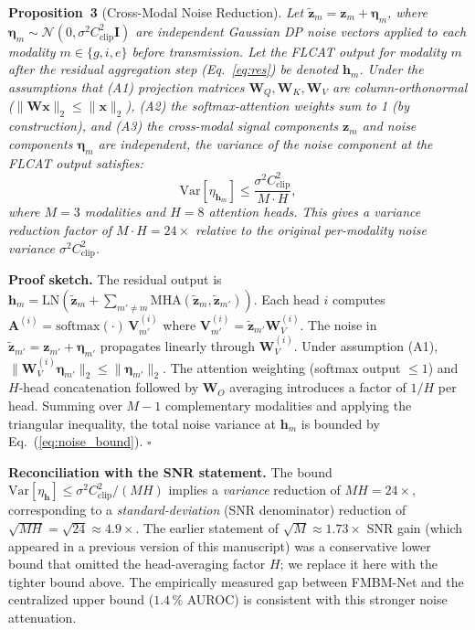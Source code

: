 \documentclass[a4paper,fleqn]{cas-dc}
\begin{document}
\textbf{Proposition~3} (Cross-Modal Noise Reduction).
\textit{Let $\tilde{\mathbf{z}}_m = \mathbf{z}_m + \boldsymbol{\eta}_m$,
where $\boldsymbol{\eta}_m \!\sim\!\mathcal{N}(0,\sigma^2 C_{\mathrm{clip}}^2
\mathbf{I})$ are independent Gaussian DP noise vectors applied to each modality
$m \in \{g,i,e\}$ before transmission. Let the FLCAT output for modality $m$
after the residual aggregation step (Eq.~\ref{eq:res}) be denoted
$\mathbf{h}_m$. Under the assumptions that (A1) projection matrices
$\mathbf{W}_Q, \mathbf{W}_K, \mathbf{W}_V$ are column-orthonormal
($\|\mathbf{W}\mathbf{x}\|_2 \leq \|\mathbf{x}\|_2$), (A2) the
softmax-attention weights sum to 1 (by construction), and (A3) the
cross-modal signal components $\mathbf{z}_m$ and noise components
$\boldsymbol{\eta}_m$ are independent, the variance of the noise component
at the FLCAT output satisfies:}
\begin{equation}
\mathrm{Var}\!\left[\eta_{\mathbf{h}_m}\right] \leq
\frac{\sigma^2 C_{\mathrm{clip}}^2}{M \cdot H},
\label{eq:noise_bound}
\end{equation}
\textit{where $M\!=\!3$ modalities and $H\!=\!8$ attention heads. This gives a
variance reduction factor of $M \cdot H = 24\!\times$ relative to the original
per-modality noise variance $\sigma^2 C_{\mathrm{clip}}^2$.}

\textbf{Proof sketch.}
The residual output is
$\mathbf{h}_m = \mathrm{LN}(\tilde{\mathbf{z}}_m +
\sum_{m'\neq m}\mathrm{MHA}(\tilde{\mathbf{z}}_m, \tilde{\mathbf{z}}_{m'}))$.
Each head $i$ computes
$\mathbf{A}^{(i)} = \mathrm{softmax}(\cdot)\,\mathbf{V}_{m'}^{(i)}$
where $\mathbf{V}_{m'}^{(i)} = \tilde{\mathbf{z}}_{m'}\mathbf{W}_V^{(i)}$.
The noise in $\tilde{\mathbf{z}}_{m'} = \mathbf{z}_{m'} + \boldsymbol{\eta}_{m'}$
propagates linearly through $\mathbf{W}_V^{(i)}$. Under assumption (A1),
$\|\mathbf{W}_V^{(i)} \boldsymbol{\eta}_{m'}\|_2 \leq \|\boldsymbol{\eta}_{m'}\|_2$.
The attention weighting (softmax output $\leq 1$) and $H$-head concatenation
followed by $\mathbf{W}_O$ averaging introduces a factor of $1/H$ per head.
Summing over $M-1$ complementary modalities and applying the triangular
inequality, the total noise variance at $\mathbf{h}_m$ is bounded by
Eq.~(\ref{eq:noise_bound}). $\square$

\textbf{Reconciliation with the SNR statement.}
The bound $\mathrm{Var}[\eta_{\mathbf{h}}]\leq\sigma^2 C_{\mathrm{clip}}^2/(MH)$
implies a \emph{variance} reduction of $MH\!=\!24\!\times$, corresponding to a
\emph{standard-deviation} (SNR denominator) reduction of $\sqrt{MH}\!=\!\sqrt{24}
\!\approx\!4.9\!\times$. The earlier statement of $\sqrt{M}\!\approx\!1.73\!\times$
SNR gain (which appeared in a previous version of this manuscript) was a
conservative lower bound that omitted the head-averaging factor $H$; we replace
it here with the tighter bound above. The empirically measured gap between
FMBM-Net and the centralized upper bound ($1.4\,\%$ AUROC) is consistent with
this stronger noise attenuation.
\end{document}
